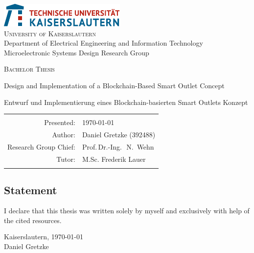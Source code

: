 \begin{titlepage}
\setcounter{page}{1}
\begin{center}
\includegraphics*[scale=2.5]{img/TUKL_LOGO.pdf}\\[3ex]

\textsc{\Large University of Kaiserslautern}\\[1.5ex]
Department of Electrical Engineering and Information Technology\\[1.5ex]
Microelectronic Systems Design Research Group \\[3ex]

\vfill
\vfill

\textsc{\Huge Bachelor Thesis}\\[6ex]
\centerline{\Large Design and Implementation of a Blockchain-Based Smart Outlet Concept}
\vspace{20pt}
\centerline{\Large Entwurf und Implementierung eines Blockchain-basierten Smart Outlets Konzept}

\vfill
\vfill

 \begin{tabular}{rl}\hline\\
 Presented:                & \quad \today \\[1.5ex]
 Author:                   & \quad Daniel Gretzke (392488) \\[1.5ex]
 Research Group Chief:     & \quad Prof.\,Dr.-Ing.\,~N.~Wehn\\[1.5ex]
 Tutor:                    & \quad M.Sc. Frederik Lauer\\[1.5ex]\\\hline
 \end{tabular}
\end{center}

    \clearpage
    \pagestyle{empty}
    \begin{flushleft}
    \section*{Statement}
    \vspace{10mm}
    I declare that this thesis was written solely by myself and exclusively with
    help of the cited resources.

    \vspace{12pt}
    Kaiserslautern, \today \\
    \vspace{20mm}
    Daniel Gretzke
    \end{flushleft}

\end{titlepage}

